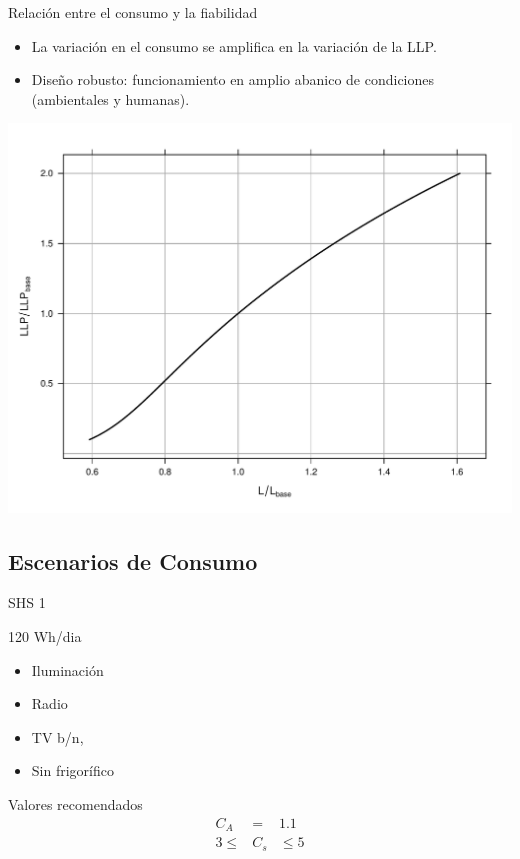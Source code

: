 \documentclass[xcolor={usenames,svgnames,dvipsnames}]{beamer}
\begin{document}
\begin{frame}[label={sec:orgc55f03b}]{Relación entre el consumo y la fiabilidad}
\begin{itemize}
\item La variación en el consumo se amplifica en la variación de la LLP.
\item Diseño robusto: funcionamiento en amplio abanico de condiciones (ambientales y humanas).
\end{itemize}
\begin{center}
\includegraphics[height=0.7\textheight]{../figs/ConsumoLLP.pdf}
\end{center}
\end{frame}

\subsection{Escenarios de Consumo}
\label{sec:orgd90c915}
\begin{frame}[label={sec:orgcf9d282}]{SHS 1}
\begin{block}{120 Wh/dia}
\begin{itemize}
\item Iluminación

\item Radio

\item TV b/n,

\item Sin frigorífico
\end{itemize}
\end{block}

\begin{block}{Valores recomendados}
$$\begin{aligned}
C_{A} & = & 1.1\\
3\leq & C_{s} & \leq5
\end{aligned}$$
\end{block}
\end{frame}
\end{document}
